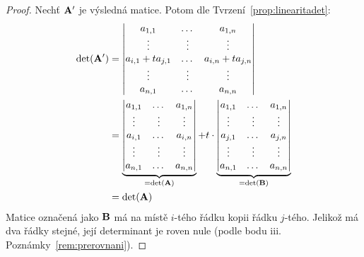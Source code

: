 \begin{proof}
    Nechť $\mathbf{A'}$ je výsledná matice. Potom dle 
    Tvrzení~\ref{prop:linearitadet}:
    \begin{align*}
        \det(\mathbf{A'}) &= \begin{vmatrix} 
                            a_{1,1} &\dots &a_{1,n} \\
                            \vdots &\vdots &\vdots \\
                            a_{i,1}+ta_{j,1} &\dots &a_{i,n}+ta_{j,n}\\
                            \vdots &\vdots &\vdots \\
                            a_{n,1} &\dots &a_{n,n}
                        \end{vmatrix} \\
                        &= \underbrace{\begin{vmatrix} 
                            a_{1,1} &\dots &a_{1,n} \\
                            \vdots &\vdots &\vdots \\
                            a_{i,1} &\dots &a_{i,n}\\
                            \vdots &\vdots &\vdots \\
                            a_{n,1} &\dots &a_{n,n}
                \end{vmatrix}}_{=\det(\mathbf{A})} + t \cdot \underbrace{\begin{vmatrix} 
                            a_{1,1} &\dots &a_{1,n} \\
                            \vdots &\vdots &\vdots \\
                            a_{j,1} &\dots &a_{j,n}\\
                            \vdots &\vdots &\vdots \\
                        a_{n,1} &\dots &a_{n,n}
                        \end{vmatrix}}_{=\det(\mathbf{B})}\\
                        &= \det(\mathbf{A})
    \end{align*}
    Matice označená jako $\mathbf{B}$ má na místě $i$-tého řádku kopii řádku $j$-tého.
    Jelikož má dva řádky stejné, její determinant je roven nule (podle bodu iii.
    Poznámky~\ref{rem:prerovnani}).
\end{proof}

